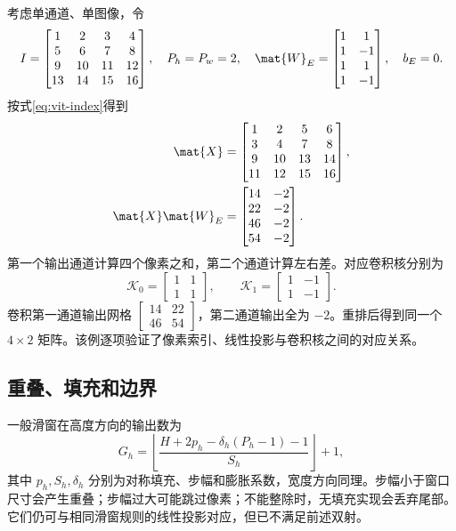 \documentclass[../textbook.tex]{subfiles}
\begin{document}
\begin{example}

考虑单通道、单图像，令
\begin{equation*}
 I=\begin{bmatrix}1&2&3&4\\5&6&7&8\\9&10&11&12\\13&14&15&16\end{bmatrix},
 \quad P_h=P_w=2,\quad
 \mat{W}_E=\begin{bmatrix}1&1\\1&-1\\1&1\\1&-1\end{bmatrix},\quad b_E=0.
\end{equation*}
按式\eqref{eq:vit-index}得到
\begin{align*}
 \mat{X}&=\begin{bmatrix}1&2&5&6\\3&4&7&8\\9&10&13&14\\11&12&15&16\end{bmatrix},\\
 \mat{X}\mat{W}_E&=\begin{bmatrix}14&-2\\22&-2\\46&-2\\54&-2\end{bmatrix}.
\end{align*}
第一个输出通道计算四个像素之和，第二个通道计算左右差。对应卷积核分别为
\begin{equation*}
 \mathcal K_0=\begin{bmatrix}1&1\\1&1\end{bmatrix},\qquad
 \mathcal K_1=\begin{bmatrix}1&-1\\1&-1\end{bmatrix}.
\end{equation*}
卷积第一通道输出网格 $\left[\begin{smallmatrix}14&22\\46&54\end{smallmatrix}\right]$，第二通道输出全为 $-2$。重排后得到同一个 $4\times2$ 矩阵。该例逐项验证了像素索引、线性投影与卷积核之间的对应关系。
\end{example}

\subsection{重叠、填充和边界}
一般滑窗在高度方向的输出数为
\begin{equation}
 G_h=\left\lfloor\frac{H+2p_h-\delta_h(P_h-1)-1}{S_h}\right\rfloor+1,
 \label{eq:vit-window}
\end{equation}
其中 $p_h,S_h,\delta_h$ 分别为对称填充、步幅和膨胀系数，宽度方向同理。步幅小于窗口尺寸会产生重叠；步幅过大可能跳过像素；不能整除时，无填充实现会丢弃尾部。它们仍可与相同滑窗规则的线性投影对应，但已不满足前述双射。
\end{document}
